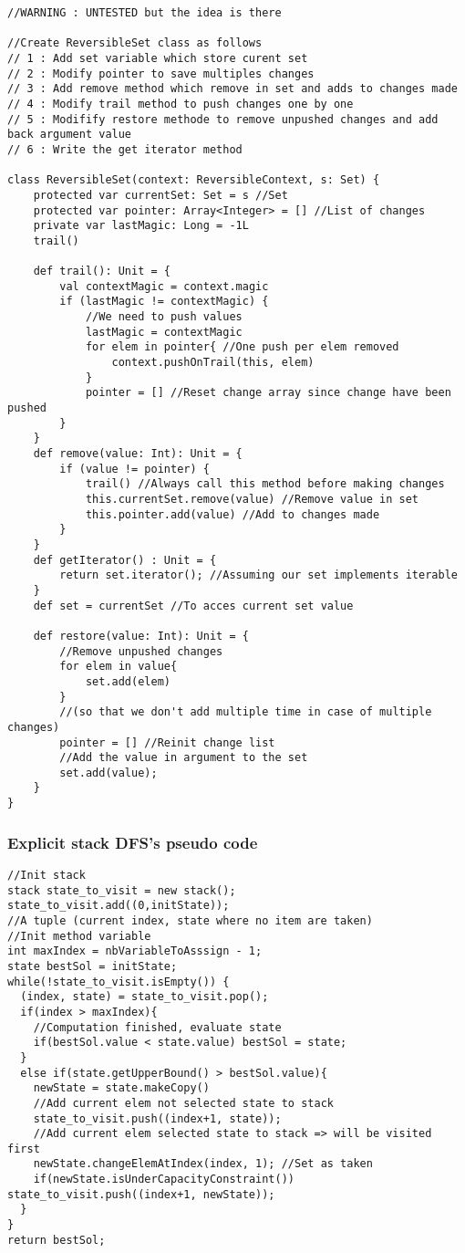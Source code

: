 \begin{lstlisting}
//WARNING : UNTESTED but the idea is there

//Create ReversibleSet class as follows
// 1 : Add set variable which store curent set
// 2 : Modify pointer to save multiples changes
// 3 : Add remove method which remove in set and adds to changes made
// 4 : Modify trail method to push changes one by one
// 5 : Modifify restore methode to remove unpushed changes and add back argument value
// 6 : Write the get iterator method

class ReversibleSet(context: ReversibleContext, s: Set) {
	protected var currentSet: Set = s //Set
	protected var pointer: Array<Integer> = [] //List of changes
	private var lastMagic: Long = -1L
	trail()
	
	def trail(): Unit = {
		val contextMagic = context.magic
		if (lastMagic != contextMagic) {
			//We need to push values
			lastMagic = contextMagic
			for elem in pointer{ //One push per elem removed
				context.pushOnTrail(this, elem)
			}
			pointer = [] //Reset change array since change have been pushed
		}
	}
	def remove(value: Int): Unit = {
		if (value != pointer) {
			trail() //Always call this method before making changes
			this.currentSet.remove(value) //Remove value in set
			this.pointer.add(value) //Add to changes made
		}
	}
	def getIterator() : Unit = {
		return set.iterator(); //Assuming our set implements iterable
	}
	def set = currentSet //To acces current set value
	
	def restore(value: Int): Unit = {
		//Remove unpushed changes
		for elem in value{
			set.add(elem)
		}
		//(so that we don't add multiple time in case of multiple changes)
		pointer = [] //Reinit change list 
		//Add the value in argument to the set
		set.add(value);
	}
}
\end{lstlisting}

\subsubsection{Explicit stack DFS's pseudo code}

\begin{lstlisting}
//Init stack
stack state_to_visit = new stack();
state_to_visit.add((0,initState)); 
//A tuple (current index, state where no item are taken)
//Init method variable
int maxIndex = nbVariableToAsssign - 1;
state bestSol = initState;
while(!state_to_visit.isEmpty()) {
  (index, state) = state_to_visit.pop();
  if(index > maxIndex){
  	//Computation finished, evaluate state
  	if(bestSol.value < state.value) bestSol = state;
  }
  else if(state.getUpperBound() > bestSol.value){
  	newState = state.makeCopy()
  	//Add current elem not selected state to stack
  	state_to_visit.push((index+1, state));
  	//Add current elem selected state to stack => will be visited first
  	newState.changeElemAtIndex(index, 1); //Set as taken
  	if(newState.isUnderCapacityConstraint()) state_to_visit.push((index+1, newState));
  }
}
return bestSol; 
\end{lstlisting}

